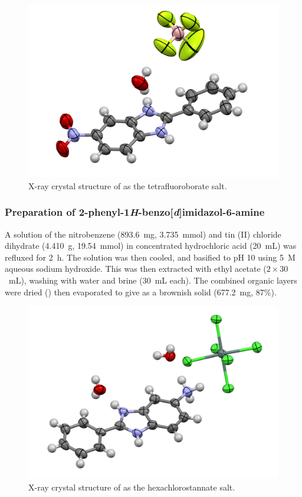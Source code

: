\begin{refsection}
\begin{figure}[ht]
    \centering
    \includegraphics[width=0.8\linewidth]{Figures/rhs-nitro-xray.pdf}
    \caption{X-ray crystal structure of  as the tetrafluoroborate salt.}
    \label{fig:rhs-nitro-xray}
\end{figure}

\subsubsection{Preparation of 2-phenyl-1\emph{H}-benzo[\emph{d}]imidazol-6-amine }
A solution of the nitrobenzene  (893.6~mg, 3.735~mmol) and tin (II) chloride dihydrate (4.410~g, 19.54~mmol) in concentrated hydrochloric acid (20~mL) was refluxed for 2~h.
The solution was then cooled, and basified to pH 10 using 5~M aqueous sodium hydroxide.
This was then extracted with ethyl acetate ($2\times30$~mL), washing with water and brine (30~mL each).
The combined organic layers were dried () then evaporated to give  as a brownish solid (677.2~mg, 87\%).

\begin{figure}[ht]
    \centering
    \includegraphics[width=0.8\linewidth]{Figures/rhs-amine-xray.pdf}
    \caption{X-ray crystal structure of  as the hexachlorostannate salt.}
    \label{fig:rhs-amine-xray}
\end{figure}


\end{refsection}
